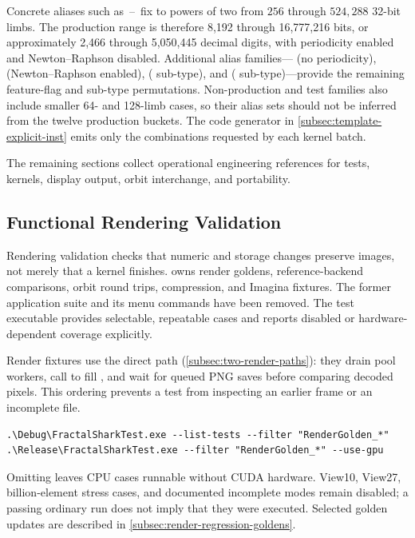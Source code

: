 \noindent
Concrete aliases such as
\,--\, fix
 to powers of two from $256$ through $524{,}288$
32-bit limbs.  The production range is therefore 8,192 through 16,777,216
bits, or approximately 2,466 through 5,050,445 decimal digits, with
periodicity enabled and Newton--Raphson disabled.
Additional alias families--- (no periodicity),
 (Newton--Raphson enabled),
 ( sub-type), and
 ( sub-type)---provide the
remaining feature-flag and sub-type permutations.  Non-production and test
families also include smaller 64- and 128-limb cases, so their alias sets should
not be inferred from the twelve production buckets.  The code generator in
\cref{subsec:template-explicit-inst} emits only the combinations requested by
each kernel batch.

The remaining sections collect operational engineering references for tests,
kernels, display output, orbit interchange, and portability.
\subsection{Functional Rendering Validation}
\label{subsec:crummy-test}

Rendering validation checks that numeric and storage changes preserve images,
not merely that a kernel finishes.  owns render goldens,
reference-backend comparisons, orbit round trips, compression, and Imagina
fixtures. The former  application suite and its menu commands
have been removed. The test executable provides selectable, repeatable cases
and reports disabled or hardware-dependent coverage explicitly.

Render fixtures use the direct path (\cref{subsec:two-render-paths}): they
drain pool workers, call  to fill ,
and wait for queued PNG saves before comparing decoded pixels. This ordering
prevents a test from inspecting an earlier frame or an incomplete file.

\begin{lstlisting}[language={},upquote=true]
.\Debug\FractalSharkTest.exe --list-tests --filter "RenderGolden_*"
.\Release\FractalSharkTest.exe --filter "RenderGolden_*" --use-gpu
\end{lstlisting}

Omitting  leaves CPU cases runnable without CUDA hardware.
View10, View27, billion-element stress cases, and documented incomplete modes
remain disabled; a passing ordinary run does not imply that they were executed.
Selected golden updates are described in \cref{subsec:render-regression-goldens}.

